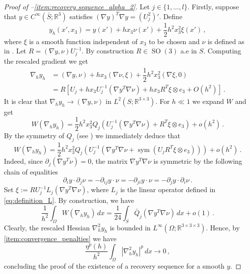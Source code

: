 \documentclass{article}
\theoremstyle{plain}
\theoremstyle{plain}
\theoremstyle{plain}
\theoremstyle{plain}
\theoremstyle{plain}
\theoremstyle{definition}
\theoremstyle{definition}
\renewcommand{\r}{\mathbb{R}}
\DeclareMathOperator{\SO}{SO}
\DeclareMathOperator{\sym}{sym}
\begin{document}
\begin{proof}[Proof of --\ref{item:recovery sequence_alpha_2}]
    Let $j \in \{1, \dots, l\}$. Firstly, suppose that $y \in C^\infty(\bar{S}; \r^3)$ satisfies $(\nabla y)^T \nabla y = (U_j^2)'$. Define
    \[
        y_h(x', x_3) = y(x') + hx_3 \nu(x') + \dfrac{1}{2} h^2 x_3^2 \xi(x') \,,
    \]
    where $\xi$ is a smooth function independent of $x_3$ to be chosen and $\nu$ is defined as in . Let $R = (\nabla y, \nu) U_j^{-1}$. By construction $R \in \SO(3)$ a.e in $S$. Computing the rescaled gradient we get
    \begin{align}
        \nabla_h y_h & = (\nabla y, \nu) + hx_3( \nabla \nu, \xi) + \dfrac{1}{2}h^2 x_3^2(\nabla \xi, 0)\\
        & = R\left[U_j + h x_3 U^{-1}_j (\nabla y^T  \nabla \nu) + hx_3 R^T \xi \otimes e_3 + O(h^2) \right] \,.
    \end{align}
    It is clear that $\nabla_h y_h \to (\nabla y, \nu)$ in $L^2(S; \r^{3 \times 3})$. For $h \ll 1$ we expand $W$ and get
    \[
        W(\nabla_h y_h) = \dfrac{1}{2}h^2 x_3^2 Q_j\left(U_j^{-1}(\nabla y^T  \nabla \nu) + R^T \xi \otimes e_3\right) + o(h^2) \,.
    \]
    By the symmetry of $Q_j$ (see ) we immediately deduce that 
    \[
        W(\nabla_h y_h) = \dfrac{1}{2}h^2 x_3^2 Q_j\left(U_j^{-1}(\nabla y^T \nabla \nu + \sym(U_jR^T \xi \otimes e_3))\right) + o(h^2) \,.
    \]
    Indeed, since $\partial_j(\nabla y^T  \nu) = 0$, the matrix $\nabla y^T \nabla \nu$ is symmetric by the following chain of equalities
    \begin{equation}\label{eq:chain_equalities_y_nu}
        \partial_i y \cdot \partial_j \nu = -\partial_{ij}y \cdot \nu = - \partial_{ji} y \cdot \nu = -\partial_j y \cdot \partial_i \nu \,.
    \end{equation}
    Set $\xi := RU_j^{-1}L_j(\nabla y^T  \nabla \nu)$, where $L_j$ is the linear operator defined in \eqref{eq:definition_L}. By construction, we have
    \[
        \dfrac{1}{h^2} \int_\Omega W(\nabla_h y_h) \, dx = \dfrac{1}{24} \int_S \bar Q_j(\nabla y^T  \nabla \nu) \, dx + o(1) \,.
    \]
    Clearly, the rescaled Hessian $\nabla_h^2 y_h$ is bounded in $L^\infty (\Omega; \r^{3 \times 3 \times 3})$. Hence, by \ref{item:convergence_penalties} we have
    \[
        \dfrac{\eta^p(h)}{h^2} \int_\Omega |\nabla_h^2 y_h|^p \, dx \to 0 \,,
    \]
    concluding the proof of the existence of a recovery sequence for a smooth $y$. 
    

\end{proof}
\end{document}
